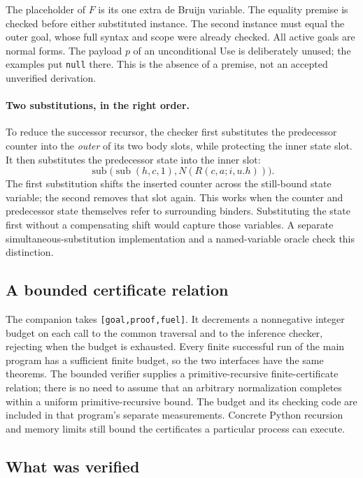 The placeholder of $F$ is its one extra de Bruijn variable. The equality
premise is checked before either substituted instance. The second
instance must equal the outer goal, whose full syntax and scope were
already checked. All active goals are normal forms. The payload $p$
of an unconditional Use is deliberately unused; the examples put
\texttt{null} there. This is the absence of a premise, not an accepted
unverified derivation.

\paragraph{Two substitutions, in the right order.}
To reduce the successor recursor, the checker first substitutes the
predecessor counter into the \emph{outer} of its two body slots, while
protecting the inner state slot. It then substitutes the predecessor
state into the inner slot:
\[
 \operatorname{sub}\bigl(\operatorname{sub}(h,c,1),
                         N(R(c,a;i,u.h))\bigr).
\]
The first substitution shifts the inserted counter across the still-bound
state variable; the second removes that slot again. This works when
the counter and predecessor state themselves refer to surrounding
binders. Substituting the state first without a compensating shift would
capture those variables. A separate simultaneous-substitution implementation
and a named-variable oracle check this distinction.

\subsection{A bounded certificate relation}

The companion  takes
\texttt{[goal,proof,fuel]}. It decrements a nonnegative integer budget on
each call to the common traversal and to the inference checker, rejecting
when the budget is exhausted. Every finite successful run of the main
program has a sufficient finite budget, so the two interfaces have the
same theorems. The bounded verifier supplies a primitive-recursive
finite-certificate relation; there is no need to assume that an arbitrary
normalization completes within a uniform primitive-recursive bound.
The budget and its checking code are included in that program's separate
measurements. Concrete Python recursion and memory limits still bound
the certificates a particular process can execute.

\subsection{What was verified}

